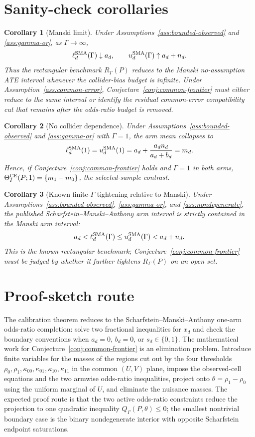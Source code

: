 \documentclass[11pt]{article}
\theoremstyle{definition}
\theoremstyle{plain}
\newtheorem{corollary}{Corollary}
\theoremstyle{remark}
\begin{document}
\section{Sanity-check corollaries}
\begin{corollary}[Manski limit]\label{cor:manski-limit}
Under Assumptions~\ref{ass:bounded-observed} and \ref{ass:gamma-or}, as \(\Gamma\to\infty\),
\[
  \ell_d^{\rm SMA}(\Gamma)\downarrow a_d,\qquad u_d^{\rm SMA}(\Gamma)\uparrow a_d+n_d.
\]
Thus the rectangular benchmark \(R_\Gamma(P)\) reduces to the Manski no-assumption ATE interval whenever the collider-bias budget is infinite.  Under Assumption~\ref{ass:common-error}, Conjecture~\ref{conj:common-frontier} must either reduce to the same interval or identify the residual common-error compatibility cut that remains after the odds-ratio budget is removed.
\end{corollary}

\begin{corollary}[No collider dependence]\label{cor:no-dependence}
Under Assumptions~\ref{ass:bounded-observed} and \ref{ass:gamma-or} with \(\Gamma=1\), the arm mean collapses to
\[
  \ell_d^{\rm SMA}(1)=u_d^{\rm SMA}(1)=a_d+\frac{a_dn_d}{a_d+b_d}=m_d.
\]
Hence, if Conjecture~\ref{conj:common-frontier} holds and \(\Gamma=1\) in both arms, \(\Theta_I^{\rm CE}(P;1)=\{m_1-m_0\}\), the selected-sample contrast.
\end{corollary}

\begin{corollary}[Known finite-\(\Gamma\) tightening relative to Manski]\label{cor:sma-tightening}
Under Assumptions~\ref{ass:bounded-observed}, \ref{ass:gamma-or}, and \ref{ass:nondegenerate}, the published Scharfstein--Manski--Anthony arm interval is strictly contained in the Manski arm interval:
\[
  a_d < \ell_d^{\rm SMA}(\Gamma) \le u_d^{\rm SMA}(\Gamma) < a_d+n_d.
\]
This is the known rectangular benchmark; Conjecture~\ref{conj:common-frontier} must be judged by whether it further tightens \(R_\Gamma(P)\) on an open set.
\end{corollary}

\section{Proof-sketch route}
The calibration theorem reduces to the Scharfstein--Manski--Anthony one-arm odds-ratio completion: solve two fractional inequalities for \(x_d\) and check the boundary conventions when \(a_d=0\), \(b_d=0\), or \(s_d\in\{0,1\}\).  The mathematical work for Conjecture~\ref{conj:common-frontier} is an elimination problem.  Introduce finite variables for the masses of the regions cut out by the four thresholds \(\rho_0,\rho_1,\kappa_{00},\kappa_{01},\kappa_{10},\kappa_{11}\) in the common \((U,V)\) plane, impose the observed-cell equations and the two armwise odds-ratio inequalities, project onto \(\theta=\rho_1-\rho_0\) using the uniform marginal of \(U\), and eliminate the nuisance masses.  The expected proof route is that the two active odds-ratio constraints reduce the projection to one quadratic inequality \(Q_\Gamma(P,\theta)\le 0\); the smallest nontrivial boundary case is the binary nondegenerate interior with opposite Scharfstein endpoint saturations.
\end{document}
